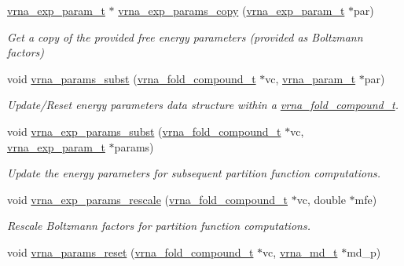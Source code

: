 \begin{DoxyCompactItemize}
\hyperlink{group__energy__parameters_ga01d8b92fe734df8d79a6169482c7d8d8}{vrna\-\_\-exp\-\_\-param\-\_\-t} $\ast$ \hyperlink{group__energy__parameters_ga70bc46be7cfa5434a71efe241c4f0609}{vrna\-\_\-exp\-\_\-params\-\_\-copy} (\hyperlink{group__energy__parameters_ga01d8b92fe734df8d79a6169482c7d8d8}{vrna\-\_\-exp\-\_\-param\-\_\-t} $\ast$par)
\begin{DoxyCompactList}\small\item\em Get a copy of the provided free energy parameters (provided as Boltzmann factors) \end{DoxyCompactList}\item 
void \hyperlink{group__energy__parameters_ga5d1909208f7ea3baa98b75afaa1f62ca}{vrna\-\_\-params\-\_\-subst} (\hyperlink{group__fold__compound_ga1b0cef17fd40466cef5968eaeeff6166}{vrna\-\_\-fold\-\_\-compound\-\_\-t} $\ast$vc, \hyperlink{group__energy__parameters_ga8a69ca7d787e4fd6079914f5343a1f35}{vrna\-\_\-param\-\_\-t} $\ast$par)
\begin{DoxyCompactList}\small\item\em Update/\-Reset energy parameters data structure within a \hyperlink{group__fold__compound_ga1b0cef17fd40466cef5968eaeeff6166}{vrna\-\_\-fold\-\_\-compound\-\_\-t}. \end{DoxyCompactList}\item 
void \hyperlink{group__energy__parameters_ga8e7ac4fab3b0cc03afbc134eaafb3525}{vrna\-\_\-exp\-\_\-params\-\_\-subst} (\hyperlink{group__fold__compound_ga1b0cef17fd40466cef5968eaeeff6166}{vrna\-\_\-fold\-\_\-compound\-\_\-t} $\ast$vc, \hyperlink{group__energy__parameters_ga01d8b92fe734df8d79a6169482c7d8d8}{vrna\-\_\-exp\-\_\-param\-\_\-t} $\ast$params)
\begin{DoxyCompactList}\small\item\em Update the energy parameters for subsequent partition function computations. \end{DoxyCompactList}\item 
void \hyperlink{group__energy__parameters_gad607bc3a5b5da16400e2ca4ea5560233}{vrna\-\_\-exp\-\_\-params\-\_\-rescale} (\hyperlink{group__fold__compound_ga1b0cef17fd40466cef5968eaeeff6166}{vrna\-\_\-fold\-\_\-compound\-\_\-t} $\ast$vc, double $\ast$mfe)
\begin{DoxyCompactList}\small\item\em Rescale Boltzmann factors for partition function computations. \end{DoxyCompactList}\item 
void \hyperlink{group__energy__parameters_gac40dc82e48a72a97cfc58b9da08a7792}{vrna\-\_\-params\-\_\-reset} (\hyperlink{group__fold__compound_ga1b0cef17fd40466cef5968eaeeff6166}{vrna\-\_\-fold\-\_\-compound\-\_\-t} $\ast$vc, \hyperlink{group__model__details_ga1f8a10e12a0a1915f2a4eff0b28ea17c}{vrna\-\_\-md\-\_\-t} $\ast$md\-\_\-p)

\end{DoxyCompactItemize}
